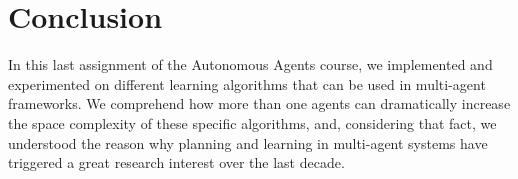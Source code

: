 \documentclass[a4paper,11pt]{article}
\begin{document}
\newpage

\section{Conclusion}
In this last assignment of the Autonomous Agents course, we implemented and experimented on different learning algorithms that can be used in multi-agent frameworks. We comprehend how more than one agents can dramatically increase the space complexity of these specific algorithms, and, considering that fact, we understood the reason why planning and learning in multi-agent systems have triggered a great research interest over the last decade.
\end{document}
